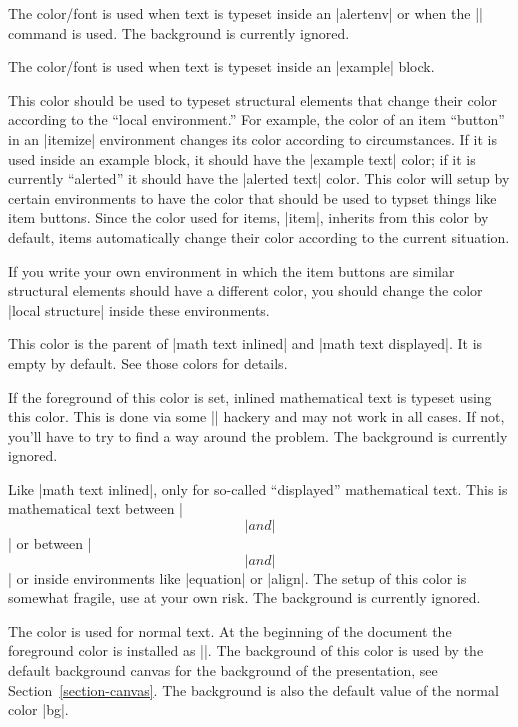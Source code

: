 \begin{itemize}
  \no\yes\yes
  The color/font is used when text is typeset inside an |alertenv| or
  when the |\alert| command is used. The background is currently
  ignored.

  \no\yes\yes
  The color/font is used when text is typeset inside an |example|
  block. 
  
  \no\yes\no
  This color should be used to typeset structural elements that change
  their color according to the ``local environment.'' For example, the
  color of an item ``button'' in an |itemize| environment changes its
  color according to circumstances. If it is used inside an example
  block, it should have the |example text| color; if it is currently
  ``alerted'' it should have the |alerted text| color. This color
  will setup by certain environments to have the color that should be
  used to typset things like item buttons. Since the color used for
  items, |item|, inherits from this color by default, items
  automatically change their color according to the current
  situation.

  If you write your own environment in which the item buttons are
  similar structural elements should have a different color, you
  should change the color |local structure| inside these
  environments. 

  \no\yes\no
  This color is the parent of |math text inlined| and
  |math text displayed|. It is empty by default. See those colors for
  details. 

  \no\yes\no
  If the foreground of this color is set, inlined mathematical text is
  typeset using this color. This is done via some |\everymath| hackery
  and may not work in all cases. If not, you'll have to try to find a
  way around the problem. The background is currently
  ignored. 

  \no\yes\no
  Like |math text inlined|, only for so-called ``displayed''
  mathematical text. This is mathematical text between |\[| and |\]| or
  between |$$| and |$$| or inside environments like |equation| or
  |align|. The setup of this color is somewhat fragile, use at your
  own risk. The background is currently
  ignored.   

  \no\yes\yes
  The color is used for normal text. At the beginning of
  the document the foreground color is installed as
  |\normalcolor|. The background of this color is used by the
  default background canvas for the background of the
  presentation, see Section~\ref{section-canvas}. The background is
  also the default value of the normal color |bg|. 


\end{itemize}

